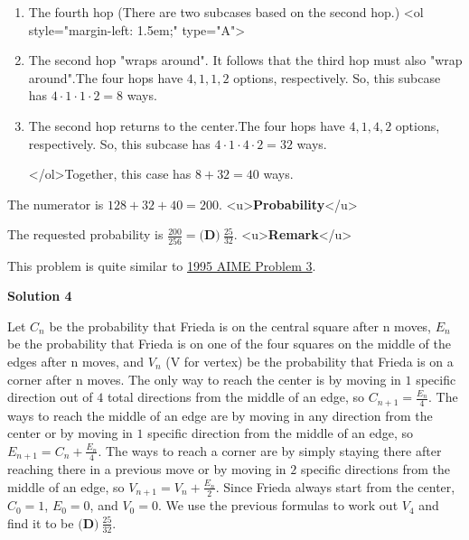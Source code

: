 \begin{enumerate}
\begin{enumerate}
 The four hops have $4, 1, 2, 4$ options, respectively. So, this case has $4\cdot1\cdot2\cdot4=32$ ways. 

  

 
        \item The fourth hop (There are two subcases based on the second hop.)
<ol style="margin-left: 1.5em;" type="A"> 
        \item The second hop "wraps around". It follows that the third hop must also "wrap around".The four hops have $4, 1, 1, 2$ options, respectively. So, this subcase has $4\cdot1\cdot1\cdot2=8$ ways. 

  

 
        \item The second hop returns to the center.The four hops have $4, 1, 4, 2$ options, respectively. So, this subcase has $4\cdot1\cdot4\cdot2=32$ ways.     

 </ol>Together, this case has $8+32=40$ ways.

 
            \end{enumerate}
            The numerator is $128+32+40=200.$
<u>\textbf{Probability}</u>

 The requested probability is $\frac{200}{256}=\boxed{\textbf{(D)} ~\frac{25}{32}}.$
<u>\textbf{Remark}</u>

 This problem is quite similar to \href{https://artofproblemsolving.com/wiki/index.php?title=1995\_AIME\_Problems/Problem\_3}{1995 AIME Problem 3}.

 



\textbf{Solution 4}

Let $C_n$ be the probability that Frieda is on the central square after n moves, $E_n$ be the probability that Frieda is on one of the four squares on the middle of the edges after n moves, and $V_n$ (V for vertex) be the probability that Frieda is on a corner after n moves. The only way to reach the center is by moving in $1$ specific direction out of $4$ total directions from the middle of an edge, so $C_{n+1}=\frac{E_n}{4}$. The ways to reach the middle of an edge are by moving in any direction from the center or by moving in $1$ specific direction from the middle of an edge, so $E_{n+1}=C_n+\frac{E_n}{4}$. The ways to reach a corner are by simply staying there after reaching there in a previous move or by moving in $2$ specific directions from the middle of an edge, so $V_{n+1}=V_n+\frac{E_n}{2}$. Since Frieda always start from the center, $C_0=1$, $E_0=0$, and $V_0=0$. We use the previous formulas to work out $V_4$ and find it to be $\boxed{\textbf{(D)} ~\frac{25}{32}}$.


\end{enumerate}
